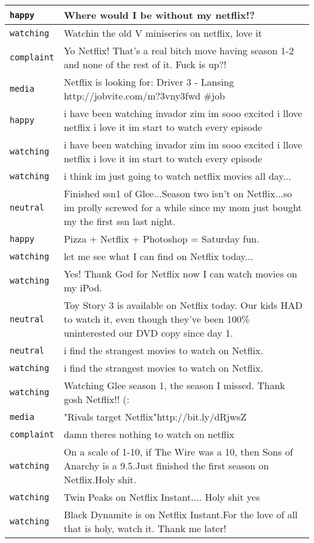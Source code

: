 \begin{center}
\begin{longtable}{|l|p{120mm}|}
      \tabularnewline\hline
         \texttt{happy} & Where would I be without my netflix!?
      \tabularnewline\hline
         \texttt{watching} & Watchin the old V miniseries on netflix, love it
      \tabularnewline\hline
         \texttt{complaint} & Yo Netflix! That's a real bitch move having season 1-2 and none of the rest of it. Fuck is up?!
      \tabularnewline\hline
         \texttt{media} & Netflix is looking for: Driver 3 - Lansing http://jobvite.com/m?3vny3fwd \#job
      \tabularnewline\hline
         \texttt{happy} & i have been watching invador zim im sooo excited i llove netflix i love it im start to watch every episode
      \tabularnewline\hline
         \texttt{watching} & i have been watching invador zim im sooo excited i llove netflix i love it im start to watch every episode
      \tabularnewline\hline
         \texttt{watching} & i think im just going to watch netflix movies all day...
      \tabularnewline\hline
         \texttt{neutral} & Finished ssn1 of Glee...Season two isn't on Netflix...so im prolly screwed for a while since my mom just bought my the first ssn last night.
      \tabularnewline\hline
         \texttt{happy} & Pizza + Netflix + Photoshop = Saturday fun.
      \tabularnewline\hline
         \texttt{watching} & let me see what I can find on Netflix today...
      \tabularnewline\hline
         \texttt{watching} & Yes! Thank God for Netflix now I can watch movies on my iPod.
      \tabularnewline\hline
         \texttt{neutral} & Toy Story 3 is available on Netflix today. Our kids HAD to watch it, even though they've been 100\% uninterested our DVD copy since day 1.
      \tabularnewline\hline
         \texttt{neutral} & i find the strangest movies to watch on Netflix.
      \tabularnewline\hline
         \texttt{watching} & i find the strangest movies to watch on Netflix.
      \tabularnewline\hline
         \texttt{watching} & Watching Glee season 1, the season I missed. Thank gosh Netflix!! (:
      \tabularnewline\hline
         \texttt{media} & "Rivals target Netflix"http://bit.ly/dRjwsZ
      \tabularnewline\hline
         \texttt{complaint} & damn theres nothing to watch on netflix
      \tabularnewline\hline
         \texttt{watching} & On a scale of 1-10, if The Wire was a 10, then Sons of Anarchy is a 9.5.Just finished the first season on Netflix.Holy shit.
      \tabularnewline\hline
         \texttt{watching} & Twin Peaks on Netflix Instant.... Holy shit yes
      \tabularnewline\hline
         \texttt{watching} & Black Dynamite is on Netflix Instant.For the love of all that is holy, watch it. Thank me later!

\end{longtable}
\end{center}
